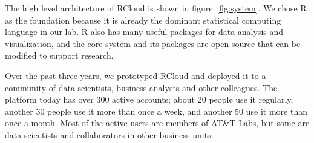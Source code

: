 The high level architecture of RCloud
is shown in figure~\ref{fig:system}.
We chose R as the foundation because it is already
the dominant statistical computing language in our lab.
R also has many useful packages for data analysis and visualization,
and the core system and its packages are open source that can be modified to
support research. 

Over the past three years, we prototyped RCloud and deployed it to
a community of data scientists, business analysts and other colleagues. The
platform today has over 300 active accounts; about 20 people use it regularly,
another 30 people use it more than once a week, and another 50 use it more than
once a month. Most of the
active users are members of AT\&T Labs, but some are data scientists and
collaborators in other business units.
